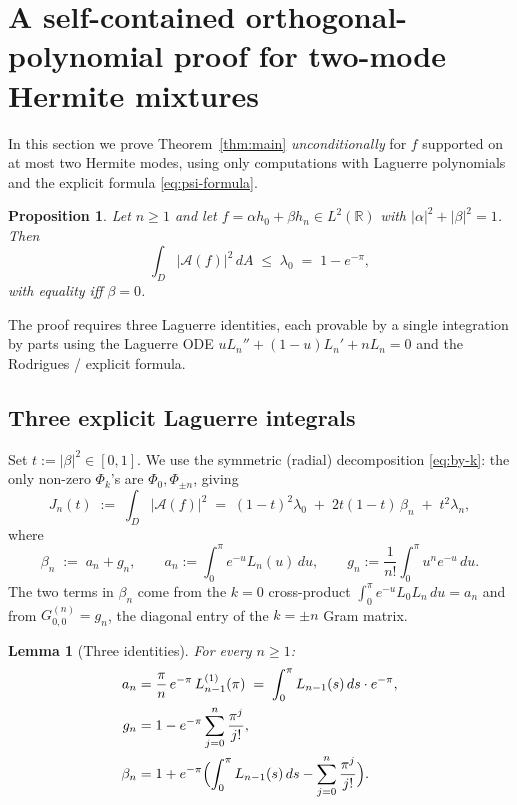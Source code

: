 \documentclass[11pt]{article}
\newtheorem{lemma}[theorem]{Lemma}
\newtheorem{proposition}[theorem]{Proposition}
\theoremstyle{definition}
\newcommand{\R}{\mathbb{R}}
\newcommand{\Amb}{\mathcal{A}}
\begin{document}
\section{A self-contained orthogonal-polynomial proof for two-mode Hermite mixtures}\label{sec:two-mode}

In this section we prove Theorem~\ref{thm:main} \emph{unconditionally} for
$f$ supported on at most two Hermite modes, using only computations with
Laguerre polynomials and the explicit formula \eqref{eq:psi-formula}.

\begin{proposition}\label{prop:two-mode}
Let $n\ge 1$ and let $f=\alpha h_{0}+\beta h_{n}\in L^{2}(\R)$ with
$|\alpha|^{2}+|\beta|^{2}=1$.  Then
\[
   \int_{D}|\Amb(f)|^{2}\,dA \;\le\; \lambda_{0} \;=\; 1-e^{-\pi},
\]
with equality iff $\beta=0$.
\end{proposition}

The proof requires three Laguerre identities, each provable by a single
integration by parts using the Laguerre ODE
$u L_{n}''+(1-u)L_{n}'+nL_{n}=0$ and the Rodrigues / explicit formula.

\subsection{Three explicit Laguerre integrals}

Set $t:=|\beta|^{2}\in[0,1]$.  We use the symmetric (radial) decomposition
\eqref{eq:by-k}: the only non-zero $\Phi_{k}$'s are $\Phi_{0},\Phi_{\pm n}$,
giving
\begin{equation}\label{eq:two-mode-Jt}
  J_{n}(t)\;:=\;\int_{D}|\Amb(f)|^{2}
  \;=\; (1-t)^{2}\lambda_{0} \;+\; 2t(1-t)\,\beta_{n} \;+\; t^{2}\lambda_{n},
\end{equation}
where
\begin{equation}\label{eq:beta-n}
  \beta_{n} \;:=\; a_{n} + g_{n},
  \qquad
  a_{n}:=\int_{0}^{\pi}e^{-u}L_{n}(u)\,du,
  \qquad
  g_{n}:=\frac{1}{n!}\int_{0}^{\pi}u^{n}e^{-u}\,du.
\end{equation}
The two terms in $\beta_{n}$ come from the $k=0$ cross-product $\int_{0}^{\pi}
e^{-u}L_{0}L_{n}\,du=a_{n}$ and from $G^{(n)}_{0,0}=g_{n}$, the diagonal
entry of the $k=\pm n$ Gram matrix.

\begin{lemma}[Three identities]\label{lem:identities}
For every $n\ge 1$:
\begin{align}
  a_{n} &= \frac{\pi}{n}\,e^{-\pi}\,L_{n-1}^{(1)}(\pi)
        \;=\; \int_{0}^{\pi}L_{n-1}(s)\,ds \cdot e^{-\pi}, \label{eq:id-a}\\
  g_{n} &= 1 - e^{-\pi}\sum_{j=0}^{n}\frac{\pi^{j}}{j!}, \label{eq:id-g}\\
  \beta_{n} &= 1 + e^{-\pi}\Bigl(\int_{0}^{\pi}L_{n-1}(s)\,ds - \sum_{j=0}^{n}\frac{\pi^{j}}{j!}\Bigr).
  \label{eq:id-beta}
\end{align}
\end{lemma}
\end{document}
